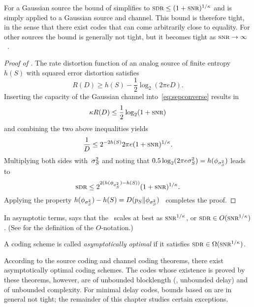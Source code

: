 \begin{remark}
  \label{rem:perflimitgaussiansource}
  For a Gaussian source the bound of  simplifies to $\sdr \le (1 +
  \snr)^{1/\k}$ and is simply  applied to a Gaussian
  source and channel. This bound is therefore tight, in the sense that there
  exist codes that can come arbitrarily close to equality. 
  For other sources the bound is generally not tight, but it becomes tight as
  $\snr \ra \infty$~\cite{LinderZ1994}.
\end{remark}

\begin{proof}[Proof of ]
  The rate distortion function of an analog source of finite entropy~$h(S)$
  with squared error distortion satisfies~\cite{Shannon1959}
  \begin{equation*}
    R(D) \ge h(S) - \frac12 \log_2(2\pi e D).
  \end{equation*}
  Inserting the capacity of the Gaussian channel into~\eqref{eq:sepconverse}
  results in
  \begin{equation*}
    \k R(D) \le \frac12 \log_2(1 + \snr)
  \end{equation*}
  and combining the two above inequalities yields
  \begin{equation*}
    \frac1D \le 2^{-2h(S)} 2\pi e (1 + \snr)^{1/\k}.
  \end{equation*}
  Multiplying both sides with~${\sigma_S^2}$ and noting that $0.5 \log_2(2\pi e {\sigma_S^2}) =
  h(\phi_{{\sigma_S^2}})$ leads to
  \begin{equation*}
    \sdr \le 2^{2(h(\phi_{\ssq}) - h(S))} (1 + \snr)^{1/\k}.
  \end{equation*}
  Applying the property $h(\phi_{{\sigma_S^2}}) - h(S) = D({p_S} \|
  \phi_{{\sigma_S^2}})$~\cite[Theorem~8.6.5]{CoverT1991} completes the proof.
\end{proof}

\begin{remark}
  \label{rem:asympbound}
  In asymptotic terms,  says that the \sdr\ scales at best as
  $\snr^{1/\k}$, or $\sdr \in O(\snr^{1/\k})$. (See  for the
  definition of the $O$-notation.)
\end{remark}

\begin{definition}
  A coding scheme is called \emph{asymptotically optimal} if it satisfies $\sdr
  \in \Omega(\snr^{1/\k})$.
\end{definition}


According to the source coding and channel coding theorems, there exist
asymptotically optimal coding schemes. The codes whose existence is proved by
these theorems, however, are of unbounded blocklength (\ie, unbounded delay) and
of unbounded complexity. For minimal delay codes, bounds based on
 are in general not tight; the remainder of this chapter
studies certain exceptions.


